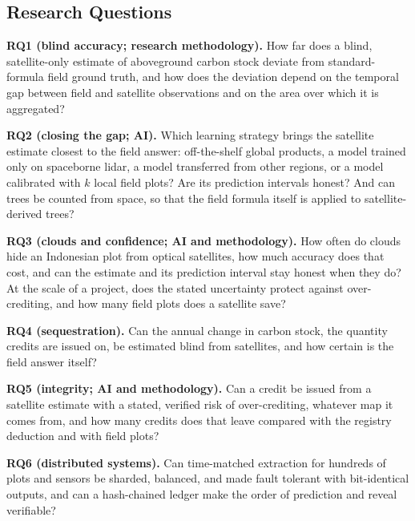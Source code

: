 \documentclass[conference,a4paper]{IEEEtran}
\begin{document}
\subsection{Research Questions}
\textbf{RQ1 (blind accuracy; research methodology).} How far does a blind, satellite-only estimate of aboveground carbon stock deviate from standard-formula field ground truth, and how does the deviation depend on the temporal gap between field and satellite observations and on the area over which it is aggregated?

\textbf{RQ2 (closing the gap; AI).} Which learning strategy brings the satellite estimate closest to the field answer: off-the-shelf global products, a model trained only on spaceborne lidar, a model transferred from other regions, or a model calibrated with $k$ local field plots? Are its prediction intervals honest? And can trees be counted from space, so that the field formula itself is applied to satellite-derived trees?

\textbf{RQ3 (clouds and confidence; AI and methodology).} How often do clouds hide an Indonesian plot from optical satellites, how much accuracy does that cost, and can the estimate and its prediction interval stay honest when they do? At the scale of a project, does the stated uncertainty protect against over-crediting, and how many field plots does a satellite save?

\textbf{RQ4 (sequestration).} Can the annual change in carbon stock, the quantity credits are issued on, be estimated blind from satellites, and how certain is the field answer itself?

\textbf{RQ5 (integrity; AI and methodology).} Can a credit be issued from a satellite estimate with a stated, verified risk of over-crediting, whatever map it comes from, and how many credits does that leave compared with the registry deduction and with field plots?

\textbf{RQ6 (distributed systems).} Can time-matched extraction for hundreds of plots and sensors be sharded, balanced, and made fault tolerant with bit-identical outputs, and can a hash-chained ledger make the order of prediction and reveal verifiable?
\end{document}
